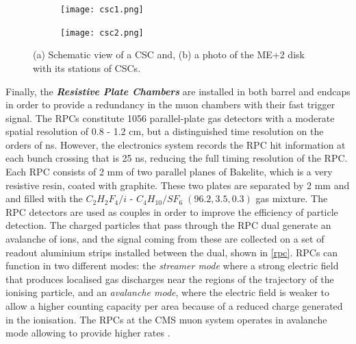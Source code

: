 \begin{figure}[ht]
	\centering
	\begin{subfigure}[b]{0.475\textwidth}
		\centering
		\texttt{[image: csc1.png]}
		\vspace{-0.75cm}
		\label{csc1}
	\end{subfigure}
	\hspace{0.2cm}
	\begin{subfigure}[b]{0.475\textwidth}  
		\centering 
		\texttt{[image: csc2.png]}
		\vspace{-0.75cm}
		\label{csc2}
	\end{subfigure}
	\caption[Schematic view of a CSC (a) and a photo of the ME+2 disk with its stations of CSCs.]
	{\small (a) Schematic view of a CSC and, (b) a photo of the ME+2 disk with its stations of CSCs\cite{Acosta2008}.}
	\label{csc}
\end{figure}

Finally, the \emph{\textbf{Resistive Plate Chambers}} are installed in both barrel and endcaps in order to provide a redundancy in the muon chambers with their fast trigger signal. The RPCs constitute 1056 parallel-plate gas detectors with a moderate spatial resolution of 0.8 - 1.2 cm, but a distinguished time resolution on the orders of ns. However, the electronics system records the RPC hit information at each bunch crossing that is 25 ns, reducing the full timing resolution of the RPC. Each RPC consists of 2 mm of two parallel planes of Bakelite, which is a very resistive resin, coated with graphite. These two plates are separated by 2 mm and and filled with the $C_2H_2F_4/i$ - $C_4H_{10}/SF_6\;(96.2, 3.5, 0.3)$ gas mixture. The RPC detectors are used as couples in order to improve the efficiency of particle detection. The charged particles that pass through the RPC dual generate an avalanche of ions, and the signal coming from these are collected on a set of readout aluminium strips installed between the dual, shown in \autoref{rpc}. RPCs can function in two different modes: the \emph{streamer mode} where a strong electric field that produces localised gas discharges near the regions of the trajectory of the ionising particle, and an \emph{avalanche mode}, where the electric field is weaker to allow a higher counting capacity per area because of a reduced charge generated in the ionisation. The RPCs at the CMS muon system operates in avalanche mode allowing to provide higher rates \cite{Sirunyan_2018}.

